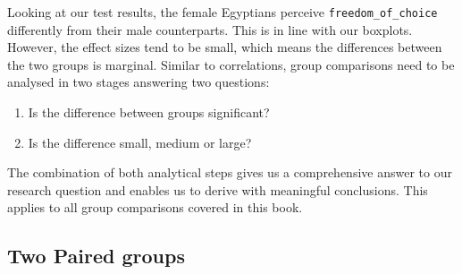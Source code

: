 \documentclass[
]{book}
\newenvironment{Shaded}{\begin{snugshade}}{\end{snugshade}}
\newcommand{\AttributeTok}[1]{\textcolor[rgb]{0.77,0.63,0.00}{#1}}
\newcommand{\CommentTok}[1]{\textcolor[rgb]{0.56,0.35,0.01}{\textit{#1}}}
\newcommand{\ConstantTok}[1]{\textcolor[rgb]{0.00,0.00,0.00}{#1}}
\newcommand{\DocumentationTok}[1]{\textcolor[rgb]{0.56,0.35,0.01}{\textbf{\textit{#1}}}}
\newcommand{\FunctionTok}[1]{\textcolor[rgb]{0.00,0.00,0.00}{#1}}
\newcommand{\NormalTok}[1]{#1}
\newcommand{\OtherTok}[1]{\textcolor[rgb]{0.56,0.35,0.01}{#1}}
\newcommand{\SpecialCharTok}[1]{\textcolor[rgb]{0.00,0.00,0.00}{#1}}
\begin{document}
\begin{Shaded}
\end{Shaded}

Looking at our test results, the female Egyptians perceive \texttt{freedom\_of\_choice} differently from their male counterparts. This is in line with our boxplots. However, the effect sizes tend to be small, which means the differences between the two groups is marginal. Similar to correlations, group comparisons need to be analysed in two stages answering two questions:

\begin{enumerate}
\def\labelenumi{\arabic{enumi}.}
\item
  Is the difference between groups significant?
\item
  Is the difference small, medium or large?
\end{enumerate}

The combination of both analytical steps gives us a comprehensive answer to our research question and enables us to derive with meaningful conclusions. This applies to all group comparisons covered in this book.

\hypertarget{two-paired-groups}{%
\subsection{Two Paired groups}\label{two-paired-groups}}
\end{document}
